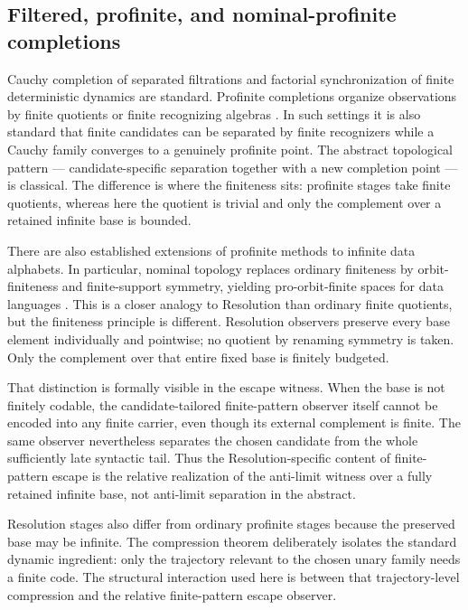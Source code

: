 \subsection{Filtered, profinite, and nominal-profinite completions}
Cauchy completion of separated filtrations and factorial synchronization of
finite deterministic dynamics are standard.  Profinite completions organize
observations by finite quotients or finite recognizing algebras
\cite{DaveyGouveiaHaviarPriestley2011,ChenAdamekMiliusUrbat2016,Moreau2024}.
In such settings it is also standard that finite candidates can be separated by
finite recognizers while a Cauchy family converges to a genuinely profinite
point.  The abstract topological pattern --- candidate-specific separation together
with a new completion point --- is classical.  The difference is where the
finiteness sits: profinite stages take finite quotients, whereas here the
quotient is trivial and only the complement over a retained infinite base is
bounded.

There are also established extensions of profinite methods to infinite data
alphabets.  In particular, nominal topology replaces ordinary finiteness by
orbit-finiteness and finite-support symmetry, yielding pro-orbit-finite spaces
for data languages \cite{BirkmannMiliusUrbat2023}.  This is a closer analogy to
Resolution than ordinary finite quotients, but the finiteness principle is
different.  Resolution observers preserve every base element individually and
pointwise; no quotient by renaming symmetry is taken.  Only the complement over
that entire fixed base is finitely budgeted.

That distinction is formally visible in the escape witness.  When the base is
not finitely codable, the candidate-tailored finite-pattern observer itself
cannot be encoded into any finite carrier, even though its external complement
is finite.  The same observer nevertheless separates the chosen candidate from
the whole sufficiently late syntactic tail.  Thus the Resolution-specific
content of finite-pattern escape is the relative realization of the anti-limit
witness over a fully retained infinite base, not anti-limit separation in the
abstract.

Resolution stages also differ from ordinary profinite stages because the
preserved base may be infinite.  The compression theorem deliberately isolates
the standard dynamic ingredient: only the trajectory relevant to the chosen
unary family needs a finite code.  The structural interaction used here is
between that trajectory-level compression and the relative finite-pattern
escape observer.

